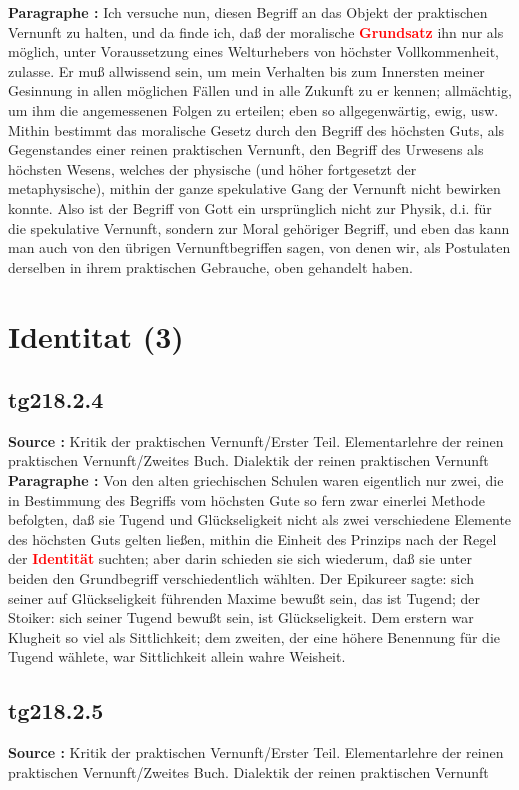 \documentclass[a4paper,12pt,twoside]{book}
\newcommand{\match}[1]{\textcolor{red}{\textbf{#1}}}
\newcommand{\unnumberedsection}[1]{
	\section*{#1}
	\addcontentsline{toc}{section}{#1}
	\markright{#1}
}
\begin{document}
	\noindent\textbf{Paragraphe : }Ich versuche nun, diesen Begriff an das Objekt der praktischen Vernunft zu halten, und da finde ich, daß der moralische \match{Grundsatz} ihn nur als möglich, unter Voraussetzung eines Welturhebers von höchster Vollkommenheit, zulasse. Er muß allwissend sein, um mein Verhalten bis zum Innersten meiner Gesinnung in allen möglichen Fällen und in alle Zukunft zu er kennen; allmächtig, um ihm die angemessenen Folgen zu erteilen; eben so allgegenwärtig, ewig, usw. Mithin bestimmt das moralische Gesetz durch den Begriff des höchsten Guts, als Gegenstandes einer reinen praktischen Vernunft, den Begriff des Urwesens als höchsten Wesens, welches der physische (und höher fortgesetzt der metaphysische), mithin der ganze spekulative  Gang der Vernunft nicht bewirken konnte. Also ist der Begriff von Gott ein ursprünglich nicht zur Physik, d.i. für die spekulative Vernunft, sondern zur Moral gehöriger Begriff, und eben das kann man auch von den übrigen Vernunftbegriffen sagen, von denen wir, als Postulaten derselben in ihrem praktischen Gebrauche, oben gehandelt haben. 
	
	\unnumberedsection{Identitat (3)} 
	\subsection*{tg218.2.4} 
	\textbf{Source : }Kritik der praktischen Vernunft/Erster Teil. Elementarlehre der reinen praktischen Vernunft/Zweites Buch. Dialektik der reinen praktischen Vernunft\\  
	
	\noindent\textbf{Paragraphe : }Von den alten griechischen Schulen waren eigentlich nur zwei, die in Bestimmung des Begriffs vom höchsten Gute so fern zwar einerlei Methode befolgten, daß sie Tugend und Glückseligkeit nicht als zwei verschiedene Elemente des höchsten Guts gelten ließen, mithin die Einheit des Prinzips nach der Regel der \match{Identität} suchten; aber darin schieden sie sich wiederum, daß sie unter beiden den Grundbegriff verschiedentlich wählten. Der Epikureer sagte: sich seiner auf Glückseligkeit führenden Maxime bewußt sein, das ist Tugend; der Stoiker: sich seiner Tugend bewußt sein, ist Glückseligkeit. Dem erstern war Klugheit so viel als  Sittlichkeit; dem zweiten, der eine höhere Benennung für die Tugend wählete, war Sittlichkeit allein wahre Weisheit. 
	
	\subsection*{tg218.2.5} 
	\textbf{Source : }Kritik der praktischen Vernunft/Erster Teil. Elementarlehre der reinen praktischen Vernunft/Zweites Buch. Dialektik der reinen praktischen Vernunft\\  
	
\end{document}
